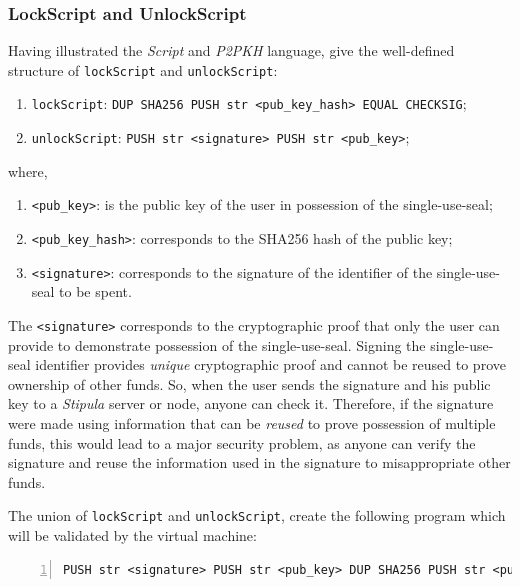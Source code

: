 \subsubsection{LockScript and UnlockScript}
\label{lock-script-and-unlock-script}

Having illustrated the \textit{Script} and \textit{P2PKH} language, give the well-defined structure of 
\verb|lockScript| and \verb|unlockScript|: %
\begin{enumerate}
  \item \verb|lockScript|: \verb|DUP SHA256 PUSH str <pub_key_hash> EQUAL CHECKSIG|;
  \item \verb|unlockScript|: \verb|PUSH str <signature> PUSH str <pub_key>|;
\end{enumerate}

where,
\begin{enumerate}
  \item \verb|<pub_key>|: is the public key of the user in possession of the single-use-seal;
  \item \verb|<pub_key_hash>|: corresponds to the SHA256 hash of the public key;
  \item \verb|<signature>|: corresponds to the signature of the identifier of the single-use-seal to be 
  spent.
\end{enumerate}

The \verb|<signature>| corresponds to the cryptographic proof that only the user can provide to 
demonstrate possession of the single-use-seal. Signing the single-use-seal identifier provides 
\textit{unique} cryptographic proof and cannot be reused to prove ownership of other funds. So, when the 
user sends the signature and his public key to a \textit{Stipula} server or node, anyone can check it. 
Therefore, if the signature were made using information that can be \textit{reused} to prove possession of 
multiple funds, this would lead to a major security problem, as anyone can verify the signature and reuse 
the information used in the signature to misappropriate other funds.

The union of \verb|lockScript| and \verb|unlockScript|, create the following program which will be 
validated by the virtual machine:

\begin{Verbatim}[numbers=left,xleftmargin=1cm,firstnumber=1,breaklines=true,breakanywhere=true,tabsize=2]
  PUSH str <signature> PUSH str <pub_key> DUP SHA256 PUSH str <pub_key_hash> EQUAL CHECKSIG
\end{Verbatim}

